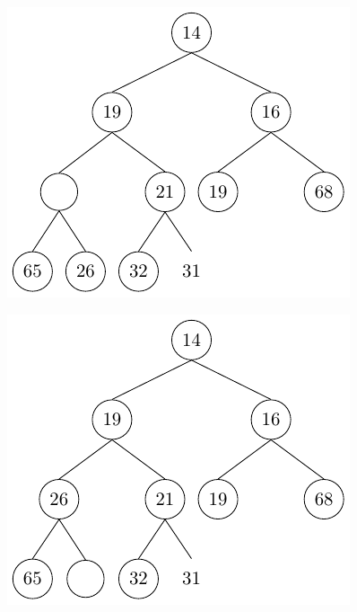 \begin{center}
\begin{minipage}{0.32\textwidth}
\begin{figure}[H]
  \centering
  \includegraphics[width=\textwidth]{Figure/HeapD4.pdf}
\end{figure}
\end{minipage}
\begin{minipage}{0.32\textwidth}
\begin{figure}[H]
  \centering
  \includegraphics[width=\textwidth]{Figure/HeapD5.pdf}

\end{figure}
\end{minipage}
\end{center}
